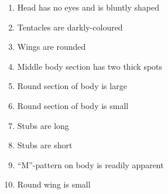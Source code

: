 \documentclass{article}
\makeatletter
\def\enumalphalphcnt#1{\expandafter\@enumalphalphcnt\csname c@#1\endcsname}
\def\@enumalphalphcnt#1{\alphalph{#1}}
\makeatother
\begin{document}
\begin{multicols}{2}
\begin{enumerate}[label=\textbf{\enumalphalphcnt*.}]
                    \item Head has no eyes and is bluntly shaped
                    \item Tentacles are darkly-coloured
                    \item Wings are rounded
                    \item Middle body section has two thick spots
                    \item Round section of body is large
                    \item Round section of body is small
                    \item Stubs are long
                    \item Stubs are short
                    \item \enquote{M}-pattern on body is readily apparent
                    \item Round wing is small
                \end{enumerate}
            \end{multicols}
\end{document}
